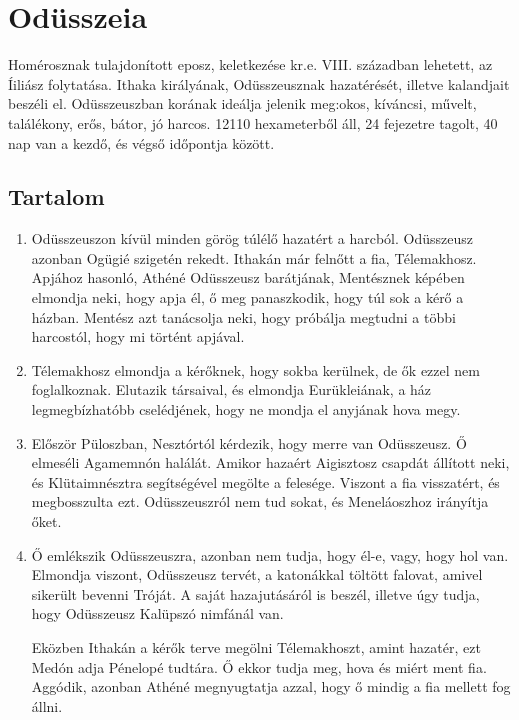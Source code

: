 \documentclass[]{article}
\begin{document}
	\section{Odüsszeia}
		Homérosznak tulajdonított eposz, keletkezése kr.e. VIII. században lehetett, az Íiliász folytatása. Ithaka királyának, Odüsszeusznak hazatérését, illetve kalandjait beszéli el. Odüsszeuszban korának ideálja jelenik meg:okos, kíváncsi, művelt, találékony, erős, bátor, jó harcos. 12110 hexameterből áll, 24 fejezetre tagolt, 40 nap van a kezdő, és végső időpontja között.\cite{WOdusszeia}
		\subsection{Tartalom}
			\begin{enumerate}
				\item Odüsszeuszon kívül minden görög túlélő hazatért a harcból. Odüsszeusz azonban Ogügié szigetén rekedt. Ithakán már felnőtt a fia, Télemakhosz. Apjához hasonló, Athéné Odüsszeusz barátjának, Mentésznek képében elmondja neki, hogy apja él, ő meg panaszkodik, hogy túl sok a kérő a házban. Mentész azt tanácsolja neki, hogy próbálja megtudni a többi harcostól, hogy mi történt apjával.
				
				\item Télemakhosz elmondja a kérőknek, hogy sokba kerülnek, de ők ezzel nem foglalkoznak. Elutazik társaival, és elmondja Eurükleiának, a ház legmegbízhatóbb cselédjének, hogy ne mondja el anyjának hova megy.
				
				\item Először Püloszban, Nesztórtól kérdezik, hogy merre van Odüsszeusz. Ő elmeséli Agamemnón halálát. Amikor hazaért Aigisztosz csapdát állított neki, és Klütaimnésztra segítségével megölte a felesége. Viszont a fia visszatért, és megbosszulta ezt. Odüsszeuszról nem tud sokat, és Meneláoszhoz irányítja őket.
				
				\item Ő emlékszik Odüsszeuszra, azonban nem tudja, hogy él-e, vagy, hogy hol van. Elmondja viszont, Odüsszeusz tervét, a katonákkal töltött falovat, amivel sikerült bevenni Tróját. A saját hazajutásáról is beszél, illetve úgy tudja, hogy Odüsszeusz Kalüpszó nimfánál van. 
				
				Eközben Ithakán a kérők terve megölni Télemakhoszt, amint hazatér, ezt Medón adja Pénelopé tudtára. Ő ekkor tudja meg, hova és miért ment fia. Aggódik, azonban Athéné megnyugtatja azzal, hogy ő mindig a fia mellett fog állni.
				

\end{enumerate}
\end{document}
